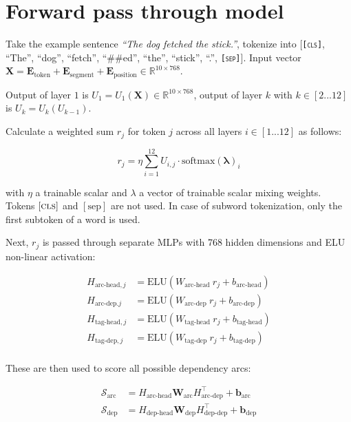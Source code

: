 \documentclass{article}
\begin{document}
	\section*{Forward pass through model}
		Take the example sentence \textit{``The dog fetched the stick.''}, tokenize into [\texttt{[\textsc{cls}]}, ``The'', ``dog'', ``fetch'', ``\#\#ed'', ``the'', ``stick'', ``.'', \texttt{[\textsc{sep}]}]. Input vector $\mathbf{X} = \mathbf{E}_{\text{token}} + \mathbf{E}_{\text{segment}} + \mathbf{E}_{\text{position}} \in \mathbb{R}^{10 \times 768}$.

		Output of layer $1$ is $U_1 = U_1(\mathbf{X}) \in \mathbb{R}^{10 \times 768}$, output of layer $k$ with $k \in [2...12]$ is $U_k = U_k(U_{k-1})$.

		Calculate a weighted sum $r_{\!j}$ for token $j$ across all layers $i \in [1...12]$ as follows:

		\begin{equation}
			r_{\!j} = \eta \sum_{i=1}^{12}U_{i,j} \cdot \text{softmax}(\mathbf{\lambda})_i
		\end{equation}

		with $\eta$ a trainable scalar and $\lambda$ a vector of trainable scalar mixing weights. Tokens $[\textsc{cls}]$ and $[\text{sep}]$ are not used. In case of subword tokenization, only the first subtoken of a word is used.

		Next, $r_{\!j}$ is passed through separate MLPs with 768 hidden dimensions and ELU non-linear activation:

		\begin{equation}
			\begin{aligned}
				H_{\text{arc-head},j} &= \text{ELU}(W_{\text{arc-head }} r_{\!j} + b_{\text{arc-head}}) \\
				H_{\text{arc-dep}.j} &= \text{ELU}(W_{\text{arc-dep }} r_{\!j} + b_{\text{arc-dep}})\\
				H_{\text{tag-head},j} &= \text{ELU}(W_{\text{tag-head }} r_{\!j} + b_{\text{tag-head}}) \\
				H_{\text{tag-dep},j} &= \text{ELU}(W_{\text{tag-dep }} r_{\!j} + b_{\text{tag-dep}})\\
			\end{aligned}
		\end{equation}

		These are then used to score all possible dependency arcs:

		\begin{equation}
			\begin{aligned}
				\mathcal{S}_\text{arc} &= H_\text{arc-head} \mathbf{W}_\text{arc}H_\text{arc-dep}^\top + \textbf{b}_\text{arc}\\
				\mathcal{S}_\text{dep} &= H_\text{dep-head} \mathbf{W}_\text{dep}H_\text{dep-dep}^\top + \textbf{b}_\text{dep}
			\end{aligned}
		\end{equation}
\end{document}
